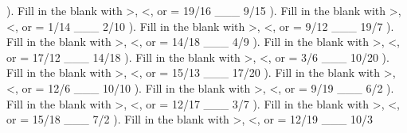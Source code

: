 \documentclass{article}%
\begin{document}
\newline%
\newline%
). Fill in the blank with >, <, or = 19/16 \_\_\_ 9/15%
\newline%
\newline%
). Fill in the blank with >, <, or = 1/14 \_\_\_ 2/10%
\newline%
\newline%
). Fill in the blank with >, <, or = 9/12 \_\_\_ 19/7%
\newline%
\newline%
). Fill in the blank with >, <, or = 14/18 \_\_\_ 4/9%
\newline%
\newline%
). Fill in the blank with >, <, or = 17/12 \_\_\_ 14/18%
\newline%
\newline%
). Fill in the blank with >, <, or = 3/6 \_\_\_ 10/20%
\newline%
\newline%
). Fill in the blank with >, <, or = 15/13 \_\_\_ 17/20%
\newline%
\newline%
). Fill in the blank with >, <, or = 12/6 \_\_\_ 10/10%
\newline%
\newline%
). Fill in the blank with >, <, or = 9/19 \_\_\_ 6/2%
\newline%
\newline%
). Fill in the blank with >, <, or = 12/17 \_\_\_ 3/7%
\newline%
\newline%
). Fill in the blank with >, <, or = 15/18 \_\_\_ 7/2%
\newline%
\newline%
). Fill in the blank with >, <, or = 12/19 \_\_\_ 10/3%
\newline%
\newline%
\newline%
\end{document}
